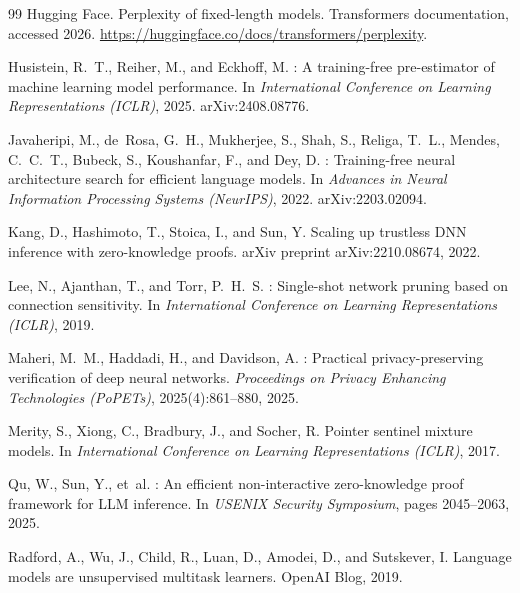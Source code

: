 \documentclass[10pt]{article}
\begin{document}
\begin{thebibliography}{99}
Hugging Face.
\newblock Perplexity of fixed-length models.
\newblock Transformers documentation, accessed 2026.
\newblock \url{https://huggingface.co/docs/transformers/perplexity}.

Husistein, R.~T., Reiher, M., and Eckhoff, M.
: A training-free pre-estimator of machine learning model
  performance.
\newblock In \emph{International Conference on Learning Representations
  (ICLR)}, 2025. arXiv:2408.08776.

Javaheripi, M., de~Rosa, G.~H., Mukherjee, S., Shah, S., Religa, T.~L.,
  Mendes, C.~C.~T., Bubeck, S., Koushanfar, F., and Dey, D.
: Training-free neural architecture search for
  efficient language models.
\newblock In \emph{Advances in Neural Information Processing Systems
  (NeurIPS)}, 2022. arXiv:2203.02094.

Kang, D., Hashimoto, T., Stoica, I., and Sun, Y.
\newblock Scaling up trustless {DNN} inference with zero-knowledge proofs.
\newblock arXiv preprint arXiv:2210.08674, 2022.

Lee, N., Ajanthan, T., and Torr, P.~H.~S.
: Single-shot network pruning based on connection sensitivity.
\newblock In \emph{International Conference on Learning Representations
  (ICLR)}, 2019.

Maheri, M.~M., Haddadi, H., and Davidson, A.
: Practical privacy-preserving verification of deep neural
  networks.
\newblock \emph{Proceedings on Privacy Enhancing Technologies (PoPETs)},
  2025(4):861--880, 2025.

Merity, S., Xiong, C., Bradbury, J., and Socher, R.
\newblock Pointer sentinel mixture models.
\newblock In \emph{International Conference on Learning Representations
  (ICLR)}, 2017.

Qu, W., Sun, Y., et~al.
: An efficient non-interactive zero-knowledge proof framework
  for {LLM} inference.
\newblock In \emph{USENIX Security Symposium}, pages 2045--2063, 2025.

Radford, A., Wu, J., Child, R., Luan, D., Amodei, D., and Sutskever, I.
\newblock Language models are unsupervised multitask learners.
\newblock OpenAI Blog, 2019.


\end{thebibliography}
\end{document}
